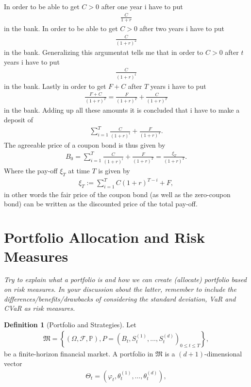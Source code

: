 \documentclass{article}
\theoremstyle{definition}
\newtheorem{definition}{Definition}[section]
\numberwithin{equation}{section}
\begin{document}
In order to be able to get $C > 0$ after one year i have to put
\begin{align}
    \frac{C}{1+r}
\end{align}
in the bank.
In order to be able to get $C > 0$ after two years i have to put 
\begin{align}
    \frac{C}{(1+r)^2}
\end{align}
in the bank.
Generalizing this argumentat tells me that in order to $C > 0$ after $t$ years i have to put
\begin{align}
    \frac{C}{(1+r)^t}
\end{align}
in the bank.
Lastly in order to get $F + C$ after $T$ years i have to put
\begin{align}
    \frac{F + C}{(1+r)^T} = \frac{F}{(1+r)^T} + \frac{C}{(1+r)^T}
\end{align}
in the bank.
Adding up all these amounts it is concluded that i have to make a deposit of
\begin{align}
    \sum_{i = 1}^T \frac{C}{(1 + r)^i} + \frac{F}{(1+r)^T}.
\end{align}
The agreeable price of a coupon bond is thus given by
\begin{align}
    B_0 = 
    \sum_{i = 1}^T \frac{C}{(1 + r)^i} + \frac{F}{(1+r)^T} =
    \frac{\xi_T}{(1 + r)^T}.
\end{align}
Where the pay-off $\xi_T$ at time $T$ is given by
\begin{align}
    \xi_T := \sum_{i = 1}^T C(1 + r)^{T -i} + F,
\end{align}
in other words the fair price of the coupon bond (as well as the zero-coupon bond) can be written as the discounted price of the total pay-off.
\newpage

\section{Portfolio Allocation and Risk Measures}
\textit{Try to explain what a portfolio is and how we can create (allocate) portfolio based on risk measures. In your discussion about the latter, remember to include the differences/benefits/drawbacks of considering the standard deviation, VaR and CVaR as risk measures.}

\begin{definition}[Portfolio and Strategies]
    Let
    \begin{align}
        \mathfrak{M} = \left\{ 
            \left(
                \Omega, \mathscr{F}, \mathbb{P}
            \right),
            P = \left(
                B_t, S_t^{(1)}, \ldots, S_t^{(d)}
            \right)_{0 \leq t \leq T}
         \right\},
    \end{align}
    be a finite-horizon financial market.
    A portfolio in $\mathfrak{M}$ is a $(d + 1)$-dimensional vector
    \begin{align}
        \Theta_t = \left(\varphi_t, \theta_t^{(1)}, \ldots, \theta_t^{(d)}\right),
    \end{align}
    
\end{definition}
\end{document}
